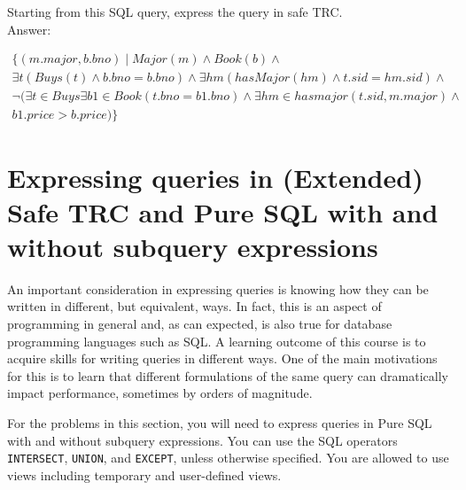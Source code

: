 \documentclass[11pt]{article}
\begin{document}
\begin{enumerate}
Starting from this SQL query, express the query in safe TRC. \\

Answer:

{\large
\[
\begin{array}{l}
\{(m.major,b.bno)\mid Major(m) \land Book(b) \land\\
 \exists t  (Buys(t) \land b.bno=b.bno) \land \exists hm(hasMajor(hm) \land t.sid=hm.sid) \land \\
 \lnot (\exists t \in Buys \exists b1 \in Book(t.bno=b1.bno) \land \exists hm \in hasmajor(t.sid,m.major)\land\\
 b1.price >b.price)
 \}
\end{array}
\]}

\end{enumerate}


\section{Expressing queries in (Extended) Safe TRC and
Pure SQL with and without subquery expressions}
\label{PureSQL}

An important consideration in expressing queries is knowing how they can be written in different, but equivalent, ways. In fact, this is an aspect of programming in general and, as can expected, is also true for database programming languages such as SQL.   A learning outcome of this course
is to acquire skills for writing queries in different ways.    One of the main motivations for this is to learn that different formulations of the same query can dramatically impact performance, sometimes by orders of magnitude.    


For the problems in this section, you will need to express  queries in {Pure SQL} with and without subquery expressions.
You can use the SQL operators {\tt INTERSECT}, {\tt UNION}, and {\tt EXCEPT}, unless otherwise specified.
You are allowed to use views including temporary and user-defined views.
\end{document}
